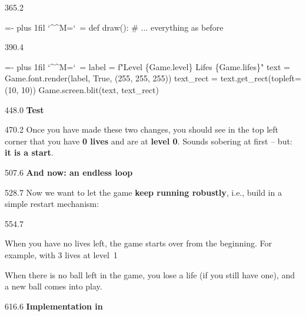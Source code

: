 \documentclass{aslab}
\makeatletter
\newcommand*\kw[1]{\textcolor{codeorange}{#1}}
\newcommand*\fn[1]{\textcolor{codecyan}{#1}}
\newcommand*\num[1]{\textcolor{codered}{#1}}
\newcommand*\cmt[1]{\textcolor{codepurple}{#1}}
\newenvironment{pycode}{\par\ttfamily\hyphenchar\font=-1
  \lineskiplimit=-\maxdimen\lineskip=0pt\parindent=0pt
  \parfillskip=0pt plus 1fil\relax
  \catcode`\^^M=\active\catcode`\ =\active\py@setup\py@gobble}{}
\newcommand*\emo[1]{\makebox[18bp][l]{\emoji{#1}}}
\makeatother
\begin{document}
\begin{region}[pitch=13.2]{365.2}
\begin{pycode}
    \kw{def} \fn{draw}():
        \cmt{\# ... everything as before}
\end{pycode}
\end{region}
\begin{region}[]{390.4}
\begin{pycode}
        label = f\num{"Level \{Game.level\} Lifes \{Game.lifes\}"}
        text = Game.font.render(label, \fn{True}, (\num{255}, \num{255}, \num{255}))
        text\_rect = text.get\_rect(topleft=(\num{10}, \num{10}))
        Game.screen.blit(text, text\_rect)
\end{pycode}
\end{region}

\begin{region}{448.0}
\emo{1F9EA}\textbf{Test}
\end{region}

\begin{region}[pitch=14.3]{470.2}
Once you have made these two changes, you should see in the top left corner
that you have \textbf{0 lives} and are at \textbf{level 0}. Sounds sobering
at first -- but: \textbf{it is a start}.
\end{region}

\begin{region}{507.6}
\emo{1F501}\textbf{And now: an endless loop}
\end{region}

\begin{region}[pitch=13.4]{528.7}
Now we want to let the game \textbf{keep running robustly}, i.e., build in a
simple restart mechanism:
\end{region}

\begin{region}[pitch=13.33]{554.7}
\begin{dashlist}
\item When you have no lives left, the game starts over from the beginning.
  For example, with 3 lives at level~1
\item When there is no ball left in the game, you lose a life (if you still
  have one), and a new ball comes into play.
\end{dashlist}
\end{region}

\begin{region}{616.6}
\emo{1F527}\textbf{Implementation in} 
\end{region}
\end{document}

